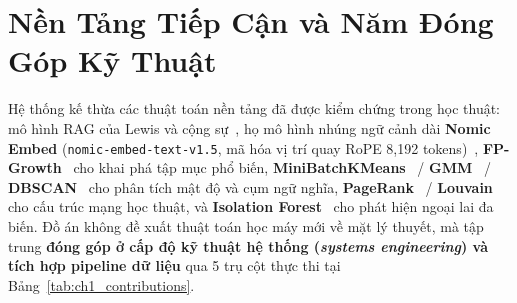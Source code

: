 \section{Nền Tảng Tiếp Cận và Năm Đóng Góp Kỹ Thuật}
\label{sec:ch1_contributions}

Hệ thống kế thừa các thuật toán nền tảng đã được kiểm chứng trong học thuật: mô hình RAG của Lewis và cộng sự~\cite{lewis2020retrieval}, họ mô hình nhúng ngữ cảnh dài \textbf{Nomic Embed} (\texttt{nomic-embed-text-v1.5}, mã hóa vị trí quay RoPE 8,192 tokens)~\cite{nussbaum2024nomic,nomicmodelcard2024}, \textbf{FP-Growth}~\cite{han2000mining} cho khai phá tập mục phổ biến, \textbf{MiniBatchKMeans}~\cite{macqueen1967some} / \textbf{GMM}~\cite{dempster1977maximum} / \textbf{DBSCAN}~\cite{ester1996density} cho phân tích mật độ và cụm ngữ nghĩa, \textbf{PageRank}~\cite{page1999pagerank} / \textbf{Louvain}~\cite{blondel2008fast} cho cấu trúc mạng học thuật, và \textbf{Isolation Forest}~\cite{liu2008isolation} cho phát hiện ngoại lai đa biến. Đồ án không đề xuất thuật toán học máy mới về mặt lý thuyết, mà tập trung \textbf{đóng góp ở cấp độ kỹ thuật hệ thống (\textit{systems engineering}) và tích hợp pipeline dữ liệu} qua 5 trụ cột thực thi tại Bảng~\ref{tab:ch1_contributions}.

